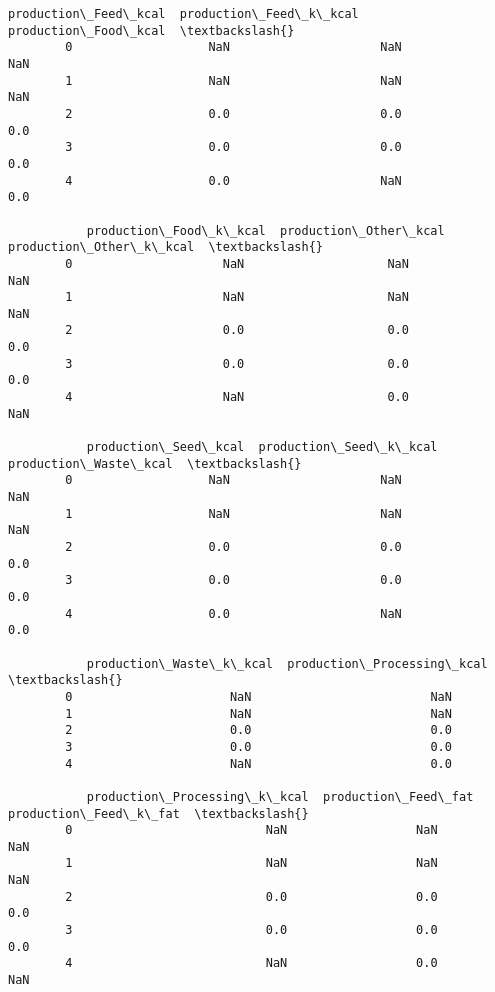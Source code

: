 \documentclass[11pt]{article}
\begin{document}
\begin{Verbatim}[commandchars=\\\{\}]
           production\_Feed\_kcal  production\_Feed\_k\_kcal  production\_Food\_kcal  \textbackslash{}
        0                   NaN                     NaN                   NaN   
        1                   NaN                     NaN                   NaN   
        2                   0.0                     0.0                   0.0   
        3                   0.0                     0.0                   0.0   
        4                   0.0                     NaN                   0.0   
        
           production\_Food\_k\_kcal  production\_Other\_kcal  production\_Other\_k\_kcal  \textbackslash{}
        0                     NaN                    NaN                      NaN   
        1                     NaN                    NaN                      NaN   
        2                     0.0                    0.0                      0.0   
        3                     0.0                    0.0                      0.0   
        4                     NaN                    0.0                      NaN   
        
           production\_Seed\_kcal  production\_Seed\_k\_kcal  production\_Waste\_kcal  \textbackslash{}
        0                   NaN                     NaN                    NaN   
        1                   NaN                     NaN                    NaN   
        2                   0.0                     0.0                    0.0   
        3                   0.0                     0.0                    0.0   
        4                   0.0                     NaN                    0.0   
        
           production\_Waste\_k\_kcal  production\_Processing\_kcal  \textbackslash{}
        0                      NaN                         NaN   
        1                      NaN                         NaN   
        2                      0.0                         0.0   
        3                      0.0                         0.0   
        4                      NaN                         0.0   
        
           production\_Processing\_k\_kcal  production\_Feed\_fat  production\_Feed\_k\_fat  \textbackslash{}
        0                           NaN                  NaN                    NaN   
        1                           NaN                  NaN                    NaN   
        2                           0.0                  0.0                    0.0   
        3                           0.0                  0.0                    0.0   
        4                           NaN                  0.0                    NaN   
        

\end{Verbatim}
\end{document}
